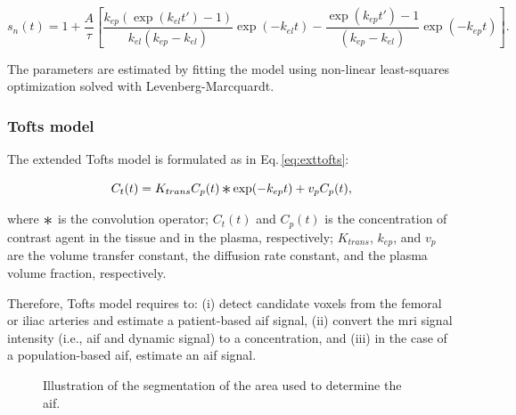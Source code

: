 \begin{equation}
  s_n(t) = 1 + \frac{A}{\tau} \left[ \frac{k_{ep} \left( \exp(k_{el} t') - 1 \right)}{k_{el}(k_{ep} - k_{el})} \exp(- k_{el} t) - \frac{\exp(k_{ep} t') - 1}{(k_{ep} - k_{el})} \exp(- k_{ep} t) \right].
  \label{eq:hoffmann}
\end{equation}

The parameters are estimated by fitting the model using non-linear least-squares optimization solved with Levenberg-Marcquardt.

\subsubsection{Tofts model}\label{sec:tofts}

The extended Tofts model is formulated as in Eq.\,\eqref{eq:exttofts}:

\begin{equation}
  C_t(t) = K_{trans} C_p(t) \Conv \exp(-k_{ep}t) + v_p C_p(t),
  \label{eq:exttofts}
\end{equation}

\noindent where $\Conv$ is the convolution operator; $C_t(t)$ and $C_p(t)$ is the concentration of contrast agent in the tissue and in the plasma, respectively; $K_{trans}$, $k_{ep}$, and $v_p$ are the volume transfer constant, the diffusion rate constant, and the plasma volume fraction, respectively.

Therefore, Tofts model requires to:
(i) detect candidate voxels from the femoral or iliac arteries and estimate a patient-based \ac{aif} signal,
(ii) convert the \ac{mri} signal intensity (i.e., \ac{aif} and dynamic signal) to a concentration, and
(iii) in the case of a population-based \ac{aif}, estimate an \ac{aif} signal.

\begin{figure}
  \centering
  \hspace*{\fill}
   \hfill
   \hfill
  \hspace*{\fill}
  \caption{Illustration of the segmentation of the area used to determine the \acs*{aif}.}
  \label{fig:aif}
\end{figure}

